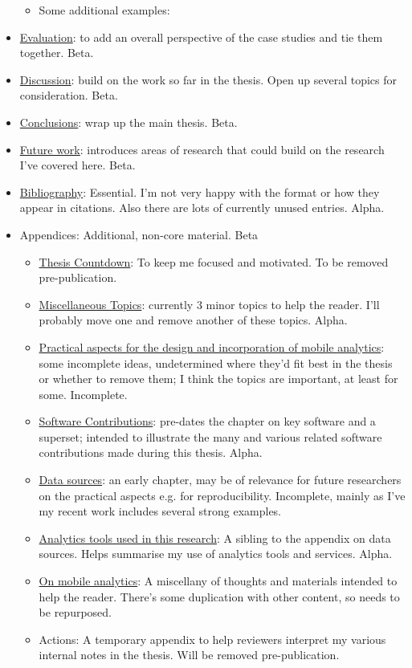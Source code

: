 \begin{itemize}
\begin{itemize}
        \item Some additional examples:
    \end{itemize}
    \item \href{chapter-evaluation}{Evaluation}: to add an overall perspective of the case studies and tie them together. Beta.
    \item \href{chapter-discussion}{Discussion}: build on the work so far in the thesis. Open up several topics for consideration. Beta.
    \item \href{chapter-conclusions}{Conclusions}: wrap up the main thesis. Beta.
    \item \href{chapter-future-work}{Future work}: introduces areas of research that could build on the research I've covered here. Beta.
    \item \href{the-bibliography-follows}{Bibliography}: Essential. I'm not very happy with the format or how they appear in citations. Also there are lots of currently unused entries. Alpha.
    \item Appendices: Additional, non-core material. Beta
    \begin{itemize}
        \item \href{app:thesis-countdown}{Thesis Countdown}: To keep me focused and motivated. To be removed pre-publication.
        \item \href{app:miscellaneous-topics}{Miscellaneous Topics}: currently 3 minor topics to help the reader. I'll probably move one and remove another of these topics. Alpha.
        \item \href{app:practical-aspects}{Practical aspects for the design and incorporation of mobile analytics}: some incomplete ideas, undetermined where they'd fit best in the thesis or whether to remove them; I think the topics are important, at least for some. Incomplete.
        \item \href{app:software-contributions}{Software Contributions}: pre-dates the chapter on key software and a superset; intended to illustrate the many and various related software contributions made during this thesis. Alpha.
        \item \href{section-case-studies-data-sources}{Data sources}: an early chapter, may be of relevance for future researchers on the practical aspects e.g. for reproducibility. Incomplete, mainly as I've my recent work includes several strong examples.
        \item \href{appendix-analytics-tools}{Analytics tools used in this research}: A sibling to the appendix on data sources. Helps summarise my use of analytics tools and services. Alpha.
        \item \href{appendix-on-mobile-analytics}{On mobile analytics}: A miscellany of thoughts and materials intended to help the reader. There's some duplication with other content, so needs to be repurposed.
        \item Actions: A temporary appendix to help reviewers interpret my various internal notes in the thesis. Will be removed pre-publication.
    \end{itemize}
    
\end{itemize}

